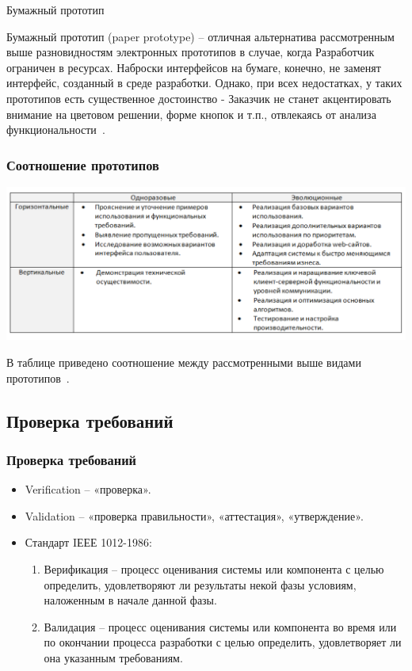\documentclass{../industrial-development}
\begin{document}
{\alert{Бумажный прототип}

Бумажный прототип (paper prototype) – отличная альтернатива рассмотренным выше разновидностям электронных прототипов в случае, когда Разработчик ограничен в ресурсах. Наброски интерфейсов на бумаге, конечно, не заменят интерфейс, созданный в среде разработки. Однако, при всех недостатках, у таких прототипов есть существенное достоинство - Заказчик не станет акцентировать внимание на цветовом решении, форме кнопок и т.п., отвлекаясь от анализа функциональности~\cite[с.~54--55]{Maglinec}.

\begin{frame} \frametitle {Соотношение прототипов}
 \centerline{\includegraphics[width=1.2\textwidth]{pict8.pdf}}
\end{frame}

\lecturenotes

В таблице приведено соотношение между рассмотренными выше видами прототипов~\cite[с.~55]{Maglinec}.

\subsection{Проверка требований}
\begin{frame} \frametitle {Проверка требований}
\begin{itemize}
\item \alert{Verification} -- «проверка».
\item \alert{Validation} -- «проверка правильности», «аттестация»,
«утверждение».
\item Стандарт IЕЕЕ 1012-1986:
\begin{enumerate}
\item \alert{Верификация} -- процесс оценивания системы или компонента с целью определить, удовлетворяют ли
результаты некой фазы условиям, наложенным в начале данной фазы.
\item \alert{Валидация} -- процесс оценивания системы или компонента во время или по окончании процесса разработки с целью определить, удовлетворяет ли она указанным требованиям.
\end{enumerate}
\end{itemize}


\end{frame}}
\end{document}
